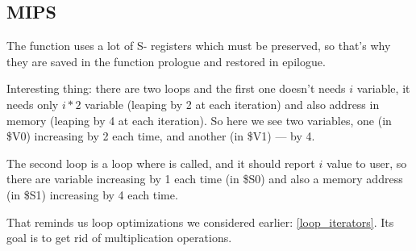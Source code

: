 ﻿\ifx\RUSSIAN\undefined
\subsection{MIPS}
The function uses a lot of S- registers which must be preserved, so that's why they are saved in the function
prologue and restored in epilogue.



Interesting thing: there are two loops and the first one doesn't needs $i$ variable, it needs only 
$i*2$ variable (leaping by 2 at each iteration) and also address in memory (leaping by 4 at each iteration).
So here we see two variables, one (in \$V0) increasing by 2 each time, and another (in \$V1) --- by 4.

The second loop is a loop where \printf is called, and it should report $i$ value to user, so there are variable
increasing by 1 each time (in \$S0) and also a memory address (in \$S1) increasing by 4 each time.

That reminds us loop optimizations we considered earlier: \ref{loop_iterators}.
Its goal is to get rid of multiplication operations.

\fi
